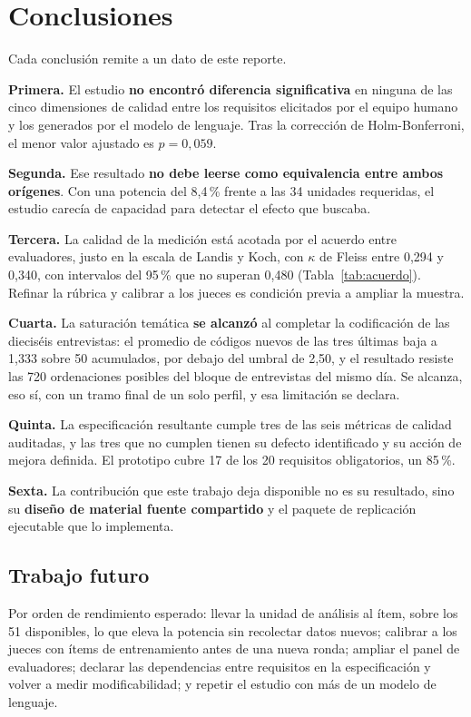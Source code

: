 \documentclass[11pt,a4paper]{article}
\begin{document}
\section{Conclusiones}

Cada conclusi\'on remite a un dato de este reporte.

\textbf{Primera.} El estudio \textbf{no encontr\'o diferencia significativa} en ninguna
de las cinco dimensiones de calidad entre los requisitos elicitados por el equipo humano
y los generados por el modelo de lenguaje. Tras la correcci\'on de Holm-Bonferroni, el
menor valor ajustado es $p = 0{,}059$.

\textbf{Segunda.} Ese resultado \textbf{no debe leerse como equivalencia entre ambos
or\'igenes}. Con una potencia del 8,4\,\% frente a las 34 unidades requeridas, el
estudio carec\'ia de capacidad para detectar el efecto que buscaba.

\textbf{Tercera.} La calidad de la medici\'on est\'a acotada por el acuerdo entre
evaluadores, justo en la escala de Landis y Koch, con $\kappa$ de Fleiss entre 0,294 y
0,340, con intervalos del 95\,\% que no superan 0,480 (Tabla~\ref{tab:acuerdo}). Refinar la r\'ubrica y calibrar a los jueces es condici\'on previa a ampliar la
muestra.

\textbf{Cuarta.} La saturaci\'on tem\'atica \textbf{se alcanz\'o} al completar la
codificaci\'on de las diecis\'eis entrevistas: el promedio de c\'odigos nuevos de las tres
\'ultimas baja a 1,333 sobre 50 acumulados, por debajo del umbral de 2,50, y el resultado
resiste las 720 ordenaciones posibles del bloque de entrevistas del mismo d\'ia. Se
alcanza, eso s\'i, con un tramo final de un solo perfil, y esa limitaci\'on se declara.

\textbf{Quinta.} La especificaci\'on resultante cumple tres de las seis m\'etricas de
calidad auditadas, y las tres que no cumplen tienen su defecto identificado y su
acci\'on de mejora definida. El prototipo cubre 17 de los 20 requisitos obligatorios, un
85\,\%.

\textbf{Sexta.} La contribuci\'on que este trabajo deja disponible no es su resultado,
sino su \textbf{dise\~no de material fuente compartido} y el paquete de replicaci\'on
ejecutable que lo implementa.

\subsection{Trabajo futuro}

Por orden de rendimiento esperado: llevar la unidad de an\'alisis al \'item, sobre los 51
disponibles, lo que eleva la potencia sin recolectar datos nuevos; calibrar a los jueces
con \'items de entrenamiento antes de una nueva ronda; ampliar el panel de evaluadores;
declarar las dependencias entre requisitos en la especificaci\'on y volver a medir
modificabilidad; y repetir el estudio con m\'as de un modelo de lenguaje.
\end{document}
